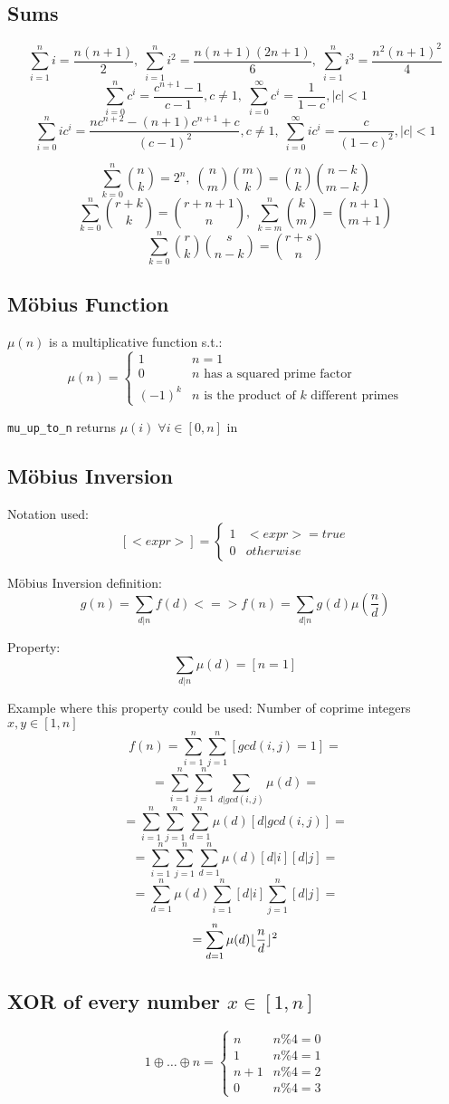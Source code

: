 \subsection{Sums}
\[\sum_{i=1}^{n}{i} = \frac{n(n+1)}{2},\; \sum_{i=1}^{n}{i^2} = \frac{n(n+1)(2n+1)}{6},\; \sum_{i=1}^{n}{i^3} = \frac{n^2(n+1)^2}{4}\]
\[\sum_{i=0}^{n}{c^i} = \frac{c^{n+1}-1}{c-1}, c \neq 1,\; \sum_{i=0}^{\infty}{c^i} = \frac{1}{1-c}, |c| < 1\]
\[\sum_{i=0}^{n}{ic^i} = \frac{nc^{n+2}-(n+1)c^{n+1}+c}{(c-1)^2}, c \neq 1,\; \sum_{i=0}^{\infty}{ic^i} = \frac{c}{(1-c)^2}, |c| < 1\]

\[\sum_{k=0}^{n}{\binom{n}{k}} = 2^n,\; \binom{n}{m}\binom{m}{k} = \binom{n}{k}\binom{n-k}{m-k}\]
\[\sum_{k=0}^{n}{\binom{r+k}{k}} = \binom{r+n+1}{n},\; \sum_{k=m}^{n}{\binom{k}{m}} = \binom{n+1}{m+1}\]
\[\sum_{k=0}^{n}{\binom{r}{k}\binom{s}{n-k} = \binom{r+s}{n}}\]


\subsection{Möbius Function}
$\mu(n)$ is a multiplicative function s.t.: \\
\[\mu(n) =
	\begin{cases}
		1 & n = 1 \\
		0 & \textrm{$n$ has a squared prime factor} \\
		(-1)^k & \textrm{$n$ is the product of $k$ different primes}
	\end{cases}
\]

\verb|mu_up_to_n| returns $\mu(i) \; \forall i \in [0, n]$ in 



\subsection{Möbius Inversion}
Notation used:
\[[<expr>] =
	\begin{cases}
		1 & <expr> = true \\
		0 & otherwise
	\end{cases}
\]

Möbius Inversion definition:
\[g(n) = \sum_{d|n}f(d) <=> f(n) = \sum_{d|n}g(d)\mu(\frac{n}{d})\]

Property:
\[\sum_{d|n}\mu(d) = [n = 1]\]

Example where this property could be used:
Number of coprime integers $x, y \in [1, n]$
\[f(n) = \sum_{i=1}^{n}\sum_{j=1}^{n}[gcd(i,j) = 1] =\]
\[= \sum_{i=1}^{n}\sum_{j=1}^{n}\sum_{d|gcd(i,j)}\mu(d) =\]
\[= \sum_{i=1}^{n}\sum_{j=1}^{n}\sum_{d=1}^{n}\mu(d)[d | gcd(i, j)] =\]
\[= \sum_{i=1}^{n}\sum_{j=1}^{n}\sum_{d=1}^{n}\mu(d)[d | i][d | j] =\]
\[= \sum_{d=1}^{n}\mu(d)\sum_{i=1}^{n}[d | i]\sum_{j=1}^{n}[d | j] =\]
\[= \sum_{d=1}^{n}\mu(d)\lfloor\frac{n}{d}\rfloor^2\]


\subsection{XOR of every number $x \in [1, n]$}
\[1 \oplus \ldots \oplus n =
	\begin{cases}
		n & n \% 4 = 0 \\
		1 & n \% 4 = 1 \\
		n + 1 & n \% 4 = 2 \\
		0 & n \% 4 = 3
	\end{cases}
\]
